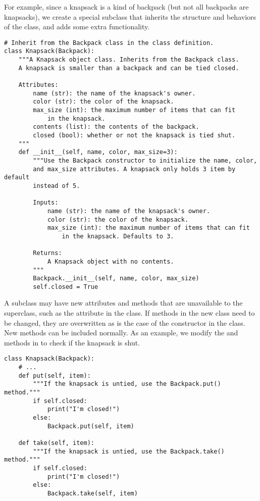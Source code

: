 For example, since a knapsack is a kind of backpack (but not all backpacks are knapsacks), we create a special  subclass that inherits the structure and behaviors of the  class, and adds some extra functionality.

\begin{lstlisting}
# Inherit from the Backpack class in the class definition.
class Knapsack(Backpack):
    """A Knapsack object class. Inherits from the Backpack class.
    A knapsack is smaller than a backpack and can be tied closed.

    Attributes:
        name (str): the name of the knapsack's owner.
        color (str): the color of the knapsack.
        max_size (int): the maximum number of items that can fit
            in the knapsack.
        contents (list): the contents of the backpack.
        closed (bool): whether or not the knapsack is tied shut.
    """
    def __init__(self, name, color, max_size=3):
        """Use the Backpack constructor to initialize the name, color,
        and max_size attributes. A knapsack only holds 3 item by default
        instead of 5.

        Inputs:
            name (str): the name of the knapsack's owner.
            color (str): the color of the knapsack.
            max_size (int): the maximum number of items that can fit
                in the knapsack. Defaults to 3.

        Returns:
            A Knapsack object with no contents.
        """
        Backpack.__init__(self, name, color, max_size)
        self.closed = True
\end{lstlisting}

A subclass may have new attributes and methods that are unavailable to the superclass, such as the  attribute in the  class.
If methods in the new class need to be changed, they are overwritten as is the case of the constructor in the  class.
New methods can be included normally.
As an example, we modify the  and  methods in  to check if the knapsack is shut.

\begin{lstlisting}
class Knapsack(Backpack):
    # ...
    def put(self, item):
        """If the knapsack is untied, use the Backpack.put() method."""
        if self.closed:
            print("I'm closed!")
        else:
            Backpack.put(self, item)

    def take(self, item):
        """If the knapsack is untied, use the Backpack.take() method."""
        if self.closed:
            print("I'm closed!")
        else:
            Backpack.take(self, item)
\end{lstlisting}

